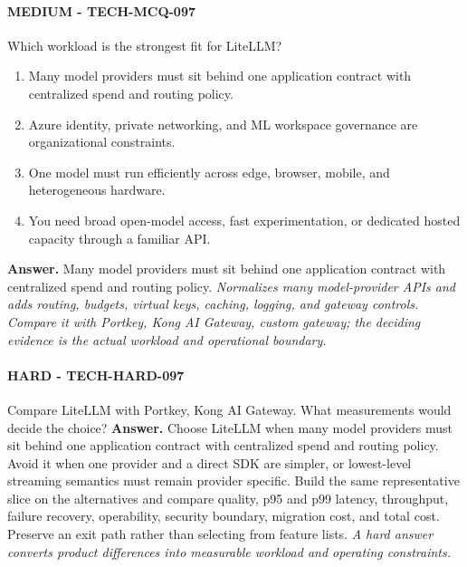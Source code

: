 \paragraph{MEDIUM - TECH-MCQ-097} Which workload is the strongest fit for LiteLLM?
\begin{enumerate}[label=\Alph*.]
\item Many model providers must sit behind one application contract with centralized spend and routing policy.
\item Azure identity, private networking, and ML workspace governance are organizational constraints.
\item One model must run efficiently across edge, browser, mobile, and heterogeneous hardware.
\item You need broad open-model access, fast experimentation, or dedicated hosted capacity through a familiar API.
\end{enumerate}
\textbf{Answer.} Many model providers must sit behind one application contract with centralized spend and routing policy.
\textit{Normalizes many model-provider APIs and adds routing, budgets, virtual keys, caching, logging, and gateway controls. Compare it with Portkey, Kong AI Gateway, custom gateway; the deciding evidence is the actual workload and operational boundary.}
\paragraph{HARD - TECH-HARD-097} Compare LiteLLM with Portkey, Kong AI Gateway. What measurements would decide the choice?
\textbf{Answer.} Choose LiteLLM when many model providers must sit behind one application contract with centralized spend and routing policy. Avoid it when one provider and a direct SDK are simpler, or lowest-level streaming semantics must remain provider specific. Build the same representative slice on the alternatives and compare quality, p95 and p99 latency, throughput, failure recovery, operability, security boundary, migration cost, and total cost. Preserve an exit path rather than selecting from feature lists.
\textit{A hard answer converts product differences into measurable workload and operating constraints.}
